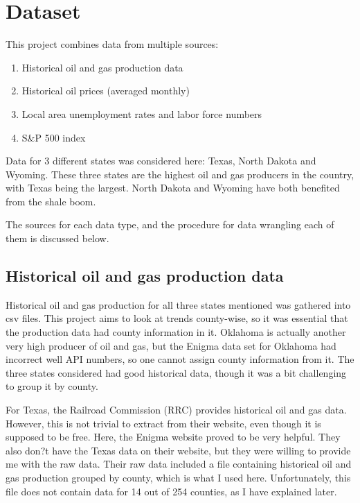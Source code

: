 \documentclass[11pt,letterpaper]{article}
\begin{document}
\section{Dataset}

This project combines data from multiple sources:
\begin{enumerate}
\item Historical oil and gas production data
\item Historical oil prices (averaged monthly)
\item Local area unemployment rates and labor force numbers
\item S\&P 500 index
\end{enumerate}

Data for 3 different states was considered here: Texas, North Dakota and Wyoming. These three states are the highest oil and gas producers in the country, with Texas being the largest. North Dakota and Wyoming have both benefited from the shale boom.

The sources for each data type, and the procedure for data wrangling each of them is discussed below.

\subsection{Historical oil and gas production data}

Historical oil and gas production for all three states mentioned was gathered into csv files. This project aims to look at trends county-wise, so it was essential that the production data had county information in it. Oklahoma is actually another very high producer of oil and gas, but the Enigma data set for Oklahoma had incorrect well API numbers, so one cannot assign county information from it. The three states considered had good historical data, though it was a bit challenging to group it by county.
 
 For Texas, the Railroad Commission (RRC) provides historical oil and gas data. However, this is not trivial to extract from their website, even though it is supposed to be free. Here, the Enigma website proved to be very helpful. They also don?t have the Texas data on their website, but they were willing to provide me with the raw data. Their raw data included a file containing historical oil and gas production grouped by county, which is what I used here. Unfortunately, this file does not contain data for 14 out of 254 counties, as I have explained later.
 
\end{document}
